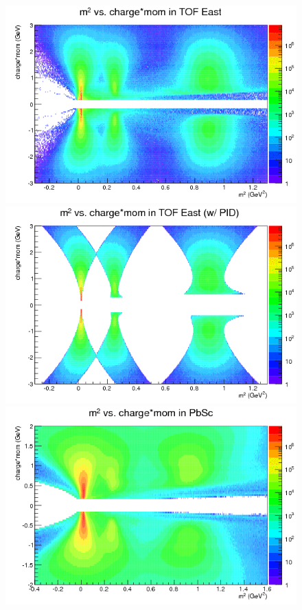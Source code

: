 \documentclass[11pt,a4paper]{article}
\numberwithin{equation}{subsection}
\numberwithin{figure}{section}
\begin{document}
\begin{figure}[H]
\centering
\includegraphics[scale=0.39]{pic/dat/nm/h_m2sum_tofe_all.png}
\includegraphics[scale=0.39]{pic/dat/nm/h_m2sum_tofe_pid.png}\\
\includegraphics[scale=0.39]{pic/dat/nm/h_m2sum_tofw_all.png}

\end{figure}
\end{document}
